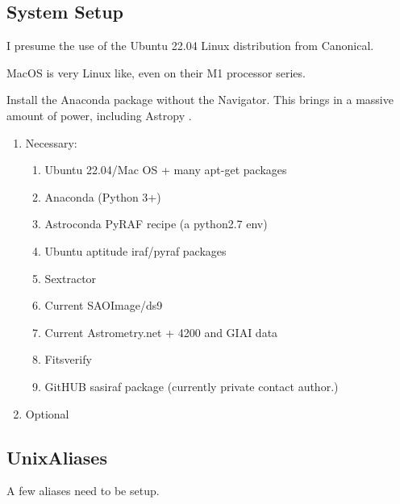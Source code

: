\documentclass[letter,11pt,oneside]{article}
\newcommand{\dhl}[1]{{\color{verbcolor}{\texttt#1}}}
\begin{document}
\clearpage

\subsection{System Setup}

I presume the use of the Ubuntu 22.04 Linux distribution from Canonical\texttrademark.


MacOS is very Linux like, even on their M1 processor series.

Install the Anaconda package without the Navigator. This brings in
a massive amount of power, including Astropy \cite{astropy:2013} \cite{astropy:2018}
\cite{astropy:2022}.
\vspace{-.15cm}
\begin{enumerate}\addtolength{\itemsep}{-0.5\baselineskip}
   \item    Necessary:
\vspace{-.15cm}
\begin{enumerate}\addtolength{\itemsep}{-0.5\baselineskip}
   \item    Ubuntu 22.04/Mac OS + many apt-get packages
   \item    Anaconda (Python 3+)
   \item    Astroconda PyRAF recipe (a python2.7 env)
   \item    Ubuntu aptitude iraf/pyraf packages
   \item    Sextractor
   \item    Current SAOImage/ds9
   \item    Current Astrometry.net + 4200 and GIAI data
   \item    Fitsverify \cite{fitsverify-1}
   \item    GitHUB sasiraf package (currently private contact author.)
\end{enumerate}
   \item    Optional
\end{enumerate}

\subsection{Unix\texttrademark Aliases}
A few aliases need to be setup.
\end{document}
